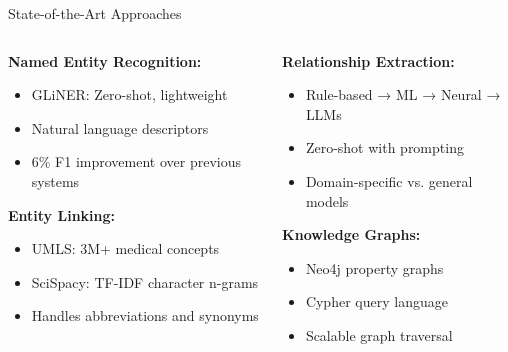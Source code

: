 \documentclass[aspectratio=169, 11pt]{beamer}
\begin{document}
\begin{frame}{State-of-the-Art Approaches}
    \vspace{0.3cm}
    \begin{columns}[T]
        \begin{column}{0.5\textwidth}
            \textbf{Named Entity Recognition:}
            \begin{itemize}
                \setlength{\itemsep}{0.2cm}
                \item GLiNER: Zero-shot, lightweight
                \item Natural language descriptors
                \item 6\% F1 improvement over previous systems
            \end{itemize}
            
            \vspace{0.4cm}
            \textbf{Entity Linking:}
            \begin{itemize}
                \setlength{\itemsep}{0.2cm}
                \item UMLS: 3M+ medical concepts
                \item SciSpacy: TF-IDF character n-grams
                \item Handles abbreviations and synonyms
            \end{itemize}
        \end{column}
        \begin{column}{0.5\textwidth}
            \textbf{Relationship Extraction:}
            \begin{itemize}
                \setlength{\itemsep}{0.2cm}
                \item Rule-based → ML → Neural → LLMs
                \item Zero-shot with prompting
                \item Domain-specific vs. general models
            \end{itemize}
            
            \vspace{0.4cm}
            \textbf{Knowledge Graphs:}
            \begin{itemize}
                \setlength{\itemsep}{0.2cm}
                \item Neo4j property graphs
                \item Cypher query language
                \item Scalable graph traversal
            \end{itemize}
        \end{column}
    \end{columns}
\end{frame}
\end{document}
